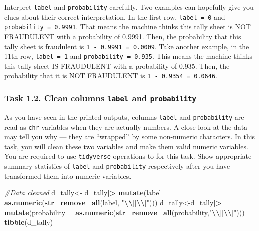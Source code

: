 \documentclass[
]{article}
\newenvironment{Shaded}{\begin{snugshade}}{\end{snugshade}}
\newcommand{\AttributeTok}[1]{\textcolor[rgb]{0.13,0.29,0.53}{#1}}
\newcommand{\CommentTok}[1]{\textcolor[rgb]{0.56,0.35,0.01}{\textit{#1}}}
\newcommand{\FunctionTok}[1]{\textcolor[rgb]{0.13,0.29,0.53}{\textbf{#1}}}
\newcommand{\NormalTok}[1]{#1}
\newcommand{\OtherTok}[1]{\textcolor[rgb]{0.56,0.35,0.01}{#1}}
\newcommand{\SpecialCharTok}[1]{\textcolor[rgb]{0.81,0.36,0.00}{\textbf{#1}}}
\newcommand{\StringTok}[1]{\textcolor[rgb]{0.31,0.60,0.02}{#1}}
\begin{document}
Interpret \texttt{label} and \texttt{probability} carefully. Two
examples can hopefully give you clues about their correct
interpretation. In the first row, \texttt{label\ =\ 0} and
\texttt{probability\ =\ 0.9991}. That means the machine thinks this
tally sheet is NOT FRAUDULENT with a probability of 0.9991. Then, the
probability that this tally sheet is fraudulent is
\texttt{1\ -\ 0.9991\ =\ 0.0009}. Take another example, in the 11th row,
\texttt{label\ =\ 1} and \texttt{probability\ =\ 0.935}. This means the
machine thinks this tally sheet IS FRAUDULENT with a probability of
0.935. Then, the probability that it is NOT FRAUDULENT is
\texttt{1\ -\ 0.9354\ =\ 0.0646}.

\clearpage

\hypertarget{task-1.2.-clean-columns-label-and-probability}{%
\subsubsection{\texorpdfstring{Task 1.2. Clean columns \texttt{label}
and
\texttt{probability}}{Task 1.2. Clean columns label and probability}}\label{task-1.2.-clean-columns-label-and-probability}}

As you have seen in the printed outputs, columns \texttt{label} and
\texttt{probability} are read as \texttt{chr} variables when they are
actually numbers. A close look at the data may tell you why --- they are
``wrapped'' by some non-numeric characters. In this task, you will clean
these two variables and make them valid numeric variables. You are
required to use \texttt{tidyverse} operations to for this task. Show
appropriate summary statistics of \texttt{label} and
\texttt{probability} respectively after you have transformed them into
numeric variables.

\begin{Shaded}
\begin{Highlighting}[]
\CommentTok{\#Data cleaned}
\NormalTok{d\_tally}\OtherTok{\textless{}{-}}\NormalTok{ d\_tally}\SpecialCharTok{|\textgreater{}}
       \FunctionTok{mutate}\NormalTok{(}\AttributeTok{label =} \FunctionTok{as.numeric}\NormalTok{(}\FunctionTok{str\_remove\_all}\NormalTok{(label, }\StringTok{"}\SpecialCharTok{\textbackslash{}\textbackslash{}}\StringTok{[|}\SpecialCharTok{\textbackslash{}\textbackslash{}}\StringTok{]"}\NormalTok{)))}
\NormalTok{d\_tally}\OtherTok{\textless{}{-}}\NormalTok{d\_tally}\SpecialCharTok{|\textgreater{}} 
       \FunctionTok{mutate}\NormalTok{(}\AttributeTok{probability =} \FunctionTok{as.numeric}\NormalTok{(}\FunctionTok{str\_remove\_all}\NormalTok{(probability,}\StringTok{"}\SpecialCharTok{\textbackslash{}\textbackslash{}}\StringTok{[|}\SpecialCharTok{\textbackslash{}\textbackslash{}}\StringTok{]"}\NormalTok{)))}
\FunctionTok{tibble}\NormalTok{(d\_tally)}
\end{Highlighting}
\end{Shaded}
\end{document}
